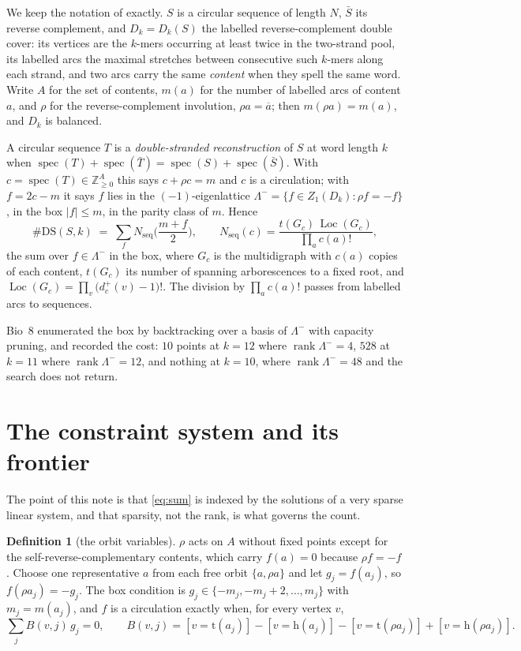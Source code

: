 \documentclass[11pt]{article}
\theoremstyle{plain}
\theoremstyle{definition}
\newtheorem{definition}[theorem]{Definition}
\theoremstyle{remark}
\newcommand{\Z}{\mathbb{Z}}
\newcommand{\rank}{\operatorname{rank}}
\newcommand{\spec}{\operatorname{spec}}
\newcommand{\Loc}{\operatorname{Loc}}
\newcommand{\Nseq}{N_{\mathrm{seq}}}
\newcommand{\DS}{\mathrm{DS}}
\newcommand{\Lm}{\Lambda^{-}}
\begin{document}
We keep the notation of \cite{Bio8} exactly. $S$ is a circular sequence of length $N$,
$\bar S$ its reverse complement, and $D_k=D_k(S)$ the labelled reverse-complement double
cover: its vertices are the $k$-mers occurring at least twice in the two-strand pool, its
labelled arcs the maximal stretches between consecutive such $k$-mers along each strand, and
two arcs carry the same \emph{content} when they spell the same word. Write $A$ for the set of
contents, $m(a)$ for the number of labelled arcs of content $a$, and $\rho$ for the
reverse-complement involution, $\rho a=\overline a$; then $m(\rho a)=m(a)$, and $D_k$ is
balanced.

A circular sequence $T$ is a \emph{double-stranded reconstruction} of $S$ at word length $k$
when $\spec(T)+\spec(\bar T)=\spec(S)+\spec(\bar S)$. With $c=\spec(T)\in\Z_{\ge0}^A$ this says
$c+\rho c=m$ and $c$ is a circulation; with $f=2c-m$ it says $f$ lies in the $(-1)$-eigenlattice
$\Lm=\{f\in Z_1(D_k):\rho f=-f\}$, in the box $|f|\le m$, in the parity class of $m$. Hence
\cite[Thm.~7]{Bio8}
\begin{equation}\label{eq:sum}
\#\DS(S,k)\;=\;\sum_{f}\Nseq\Big(\frac{m+f}{2}\Big),
\qquad
\Nseq(c)=\frac{t(G_c)\,\Loc(G_c)}{\prod_a c(a)!},
\end{equation}
the sum over $f\in\Lm$ in the box, where $G_c$ is the multidigraph with $c(a)$ copies of each
content, $t(G_c)$ its number of spanning arborescences to a fixed root, and
$\Loc(G_c)=\prod_v\big(d^+_c(v)-1\big)!$. The division by $\prod_a c(a)!$ passes from labelled
arcs to sequences.

Bio~8 enumerated the box by backtracking over a basis of $\Lm$ with capacity pruning, and
recorded the cost: $10$ points at $k=12$ where $\rank\Lm=4$, $528$ at $k=11$ where
$\rank\Lm=12$, and nothing at $k=10$, where $\rank\Lm=48$ and the search does not return.

\section{The constraint system and its frontier}\label{sec:frontier}

The point of this note is that \eqref{eq:sum} is indexed by the solutions of a very sparse
linear system, and that sparsity, not the rank, is what governs the count.

\begin{definition}[the orbit variables]\label{def:vars}
$\rho$ acts on $A$ without fixed points except for the self-reverse-complementary contents,
which carry $f(a)=0$ because $\rho f=-f$. Choose one representative $a$ from each free orbit
$\{a,\rho a\}$ and let $g_j=f(a_j)$, so $f(\rho a_j)=-g_j$. The box condition is
$g_j\in\{-m_j,-m_j+2,\dots,m_j\}$ with $m_j=m(a_j)$, and $f$ is a circulation exactly when,
for every vertex $v$,
\begin{equation}\label{eq:bal}
\sum_j B(v,j)\,g_j=0,\qquad
B(v,j)=[v=\mathrm{t}(a_j)]-[v=\mathrm{h}(a_j)]-[v=\mathrm{t}(\rho a_j)]+[v=\mathrm{h}(\rho a_j)] .
\end{equation}
\end{definition}
\end{document}
